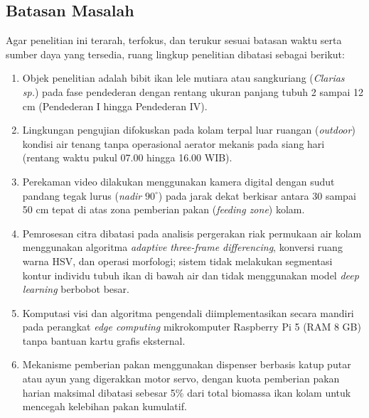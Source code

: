\subsection{Batasan Masalah}
Agar penelitian ini terarah, terfokus, dan terukur sesuai batasan waktu serta sumber daya yang tersedia, ruang lingkup penelitian dibatasi sebagai berikut:
\begin{enumerate}
    \item Objek penelitian adalah bibit ikan lele mutiara atau sangkuriang (\textit{Clarias sp.}) pada fase pendederan dengan rentang ukuran panjang tubuh 2 sampai 12 cm (Pendederan I hingga Pendederan IV).
    \item Lingkungan pengujian difokuskan pada kolam terpal luar ruangan (\textit{outdoor}) kondisi air tenang tanpa operasional aerator mekanis pada siang hari (rentang waktu pukul 07.00 hingga 16.00 WIB).
    \item Perekaman video dilakukan menggunakan kamera digital dengan sudut pandang tegak lurus (\textit{nadir} $90^\circ$) pada jarak dekat berkisar antara 30 sampai 50 cm tepat di atas zona pemberian pakan (\textit{feeding zone}) kolam.
    \item Pemrosesan citra dibatasi pada analisis pergerakan riak permukaan air kolam menggunakan algoritma \textit{adaptive three-frame differencing}, konversi ruang warna HSV, dan operasi morfologi; sistem tidak melakukan segmentasi kontur individu tubuh ikan di bawah air dan tidak menggunakan model \textit{deep learning} berbobot besar.
    \item Komputasi visi dan algoritma pengendali diimplementasikan secara mandiri pada perangkat \textit{edge computing} mikrokomputer Raspberry Pi 5 (RAM 8 GB) tanpa bantuan kartu grafis eksternal.
    \item Mekanisme pemberian pakan menggunakan dispenser berbasis katup putar atau ayun yang digerakkan motor servo, dengan kuota pemberian pakan harian maksimal dibatasi sebesar 5\% dari total biomassa ikan kolam untuk mencegah kelebihan pakan kumulatif.
\end{enumerate}

